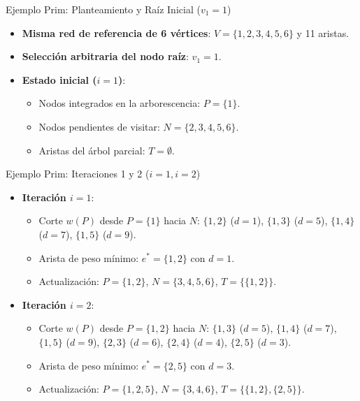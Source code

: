\documentclass[
  ignorenonframetext,
]{beamer}
\providecommand{\tightlist}{%
  \setlength{\itemsep}{0pt}\setlength{\parskip}{0pt}}
\begin{document}
\begin{frame}{Ejemplo Prim: Planteamiento y Raíz Inicial (\(v_1 = 1\))}
\label{ejemplo-prim-planteamiento-y-rauxedz-inicial-v_1-1}
\begin{itemize}
\item
  \textbf{Misma red de referencia de 6 vértices}:
  \(V = \{1, 2, 3, 4, 5, 6\}\) y 11 aristas.
\item
  \textbf{Selección arbitraria del nodo raíz}: \(v_1 = 1\).
\item
  \textbf{Estado inicial (\(i=1\))}:

  \begin{itemize}
  \tightlist
  \item
    Nodos integrados en la arborescencia: \(P = \{1\}\).
  \item
    Nodos pendientes de visitar: \(N = \{2, 3, 4, 5, 6\}\).
  \item
    Aristas del árbol parcial: \(T = \emptyset\).
  \end{itemize}
\end{itemize}
\end{frame}

\begin{frame}{Ejemplo Prim: Iteraciones 1 y 2 (\(i=1, i=2\))}
\label{ejemplo-prim-iteraciones-1-y-2-i1-i2}
\begin{itemize}
\tightlist
\item
  \textbf{Iteración \(i=1\)}:

  \begin{itemize}
  \tightlist
  \item
    Corte \(w(P)\) desde \(P = \{1\}\) hacia \(N\): \(\{1, 2\}\)
    (\(d=1\)), \(\{1, 3\}\) (\(d=5\)), \(\{1, 4\}\) (\(d=7\)),
    \(\{1, 5\}\) (\(d=9\)).
  \item
    Arista de peso mínimo: \(e^* = \{1, 2\}\) con \(d=1\).
  \item
    Actualización: \(P = \{1, 2\}\), \(N = \{3, 4, 5, 6\}\),
    \(T = \{\{1, 2\}\}\).
  \end{itemize}
\item
  \textbf{Iteración \(i=2\)}:

  \begin{itemize}
  \tightlist
  \item
    Corte \(w(P)\) desde \(P = \{1, 2\}\) hacia \(N\): \(\{1, 3\}\)
    (\(d=5\)), \(\{1, 4\}\) (\(d=7\)), \(\{1, 5\}\) (\(d=9\)),
    \(\{2, 3\}\) (\(d=6\)), \(\{2, 4\}\) (\(d=4\)), \(\{2, 5\}\)
    (\(d=3\)).
  \item
    Arista de peso mínimo: \(e^* = \{2, 5\}\) con \(d=3\).
  \item
    Actualización: \(P = \{1, 2, 5\}\), \(N = \{3, 4, 6\}\),
    \(T = \{\{1, 2\}, \{2, 5\}\}\).
  \end{itemize}
\end{itemize}
\end{frame}
\end{document}
